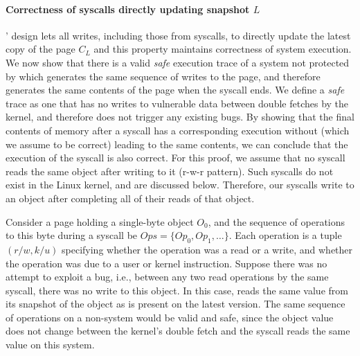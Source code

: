 \paragraph{Correctness of syscalls directly updating snapshot $L$}
\midas' design lets all writes, including those from syscalls, to directly
update the latest copy of the page $C_L$ and this property maintains correctness
of system execution.
We now show that there is a valid \emph{safe} 
execution trace of a system not protected by \midas which generates the same
sequence of writes to the page, and therefore generates the same contents
of the page when the syscall ends.
%
We define a \emph{safe} trace as one that has no writes to vulnerable data between
double fetches by the kernel, and therefore does not trigger any existing
\tocttou bugs.
%
By showing that the final contents of memory after a \midas syscall has a
corresponding execution without \midas (which we assume to be correct)
leading to the same contents,
we can conclude that the execution of the \midas syscall is also correct.
For this proof, we assume that no syscall reads the same object after writing
to it (r-w-r pattern).
Such syscalls do not exist in the Linux kernel, and are discussed below.
Therefore, our syscalls write to an object after completing all of their reads
of that object.

Consider a page holding a single-byte object $O_0$, and the
sequence of operations to this byte during a \midas syscall be
$Ops = \{Op_0, Op_1, \dots \}$.
Each operation is a tuple $(r/w, k/u)$ specifying whether the
operation was a read or a write, and whether the operation was due to
a user or kernel instruction.
Suppose there was no attempt to exploit a \tocttou bug, i.e., between
any two read operations by the same syscall, there was no write to
this object.
In this case, \midas reads the same value from its snapshot of the
object as is present on the latest version.
The same sequence of operations on a non-\midas system would be valid and
safe, since the object value does not change between the kernel's double
fetch and the syscall reads the same value on this system.

